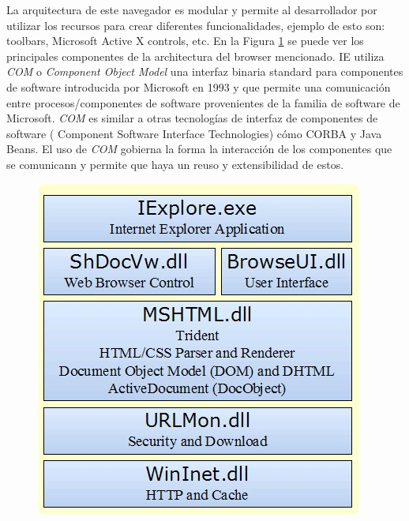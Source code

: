         La arquitectura de este navegador es modular y permite al desarrollador por utilizar los recursos para crear diferentes funcionalidades, ejemplo de esto son: toolbars, Microsoft Active X controls, etc. En la Figura \ref{fig:archIE} \cite{webpag3} se puede ver los principales componentes de la architectura del browser mencionado. IE utiliza \textit{COM} o \textit{Component Object Model} una interfaz binaria standard para componentes de software introducida por Microsoft en 1993 y que permite una comunicación entre procesos/componentes de software provenientes de la familia de software de Microsoft. \textit{COM} es similar a otras tecnologías de interfaz de componentes de software ( Component Software Interface Technologies) cómo CORBA y Java Beans. El uso de \textit{COM} gobierna la forma la interacción de los componentes que se comunicann y permite que haya un reuso y extensibilidad de estos.
        
        \begin{figure}[h!t]
		    \begin{center}
				\includegraphics[scale=0.65]{figures/IEArch.jpg}
		      \label{fig:archIE}
		    \end{center}
		\end{figure}


